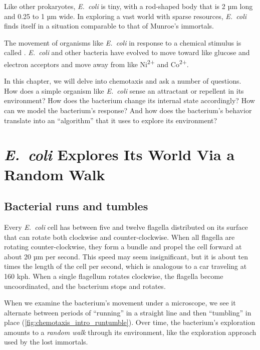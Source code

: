 Like other prokaryotes, \textit{E.~coli} is tiny, with a rod-shaped body that is 2 µm long and 0.25 to 1 µm wide. In exploring a vast world with sparse resources, \textit{E.~coli} finds itself in a situation comparable to that of Munroe's immortals.

The movement of organisms like \textit{E.~coli} in response to a chemical stimulus is called . \textit{E.~coli} and other bacteria have evolved to move toward  like glucose and electron acceptors and move away from  like Ni\textsuperscript{2+} and Co\textsuperscript{2+}.

In this chapter, we will delve into chemotaxis and ask a number of questions. How does a simple organism like \textit{E.~coli} sense an attractant or repellent in its environment? How does the bacterium change its internal state accordingly? How can we model the bacterium's response? And how does the bacterium's behavior translate into an ``algorithm'' that it uses to explore its environment?\\

\FloatBarrier
{}
\section{\textit{E.~coli} Explores Its World Via a Random Walk}
\label{sec:e_coli_explores_its_world_via_a_random_walk}

\subsection{Bacterial runs and tumbles}

Every \textit{E.~coli} cell has between five and twelve flagella distributed on its surface that can rotate both clockwise and counter-clockwise. When all flagella are rotating counter-clockwise, they form a bundle and propel the cell forward at about 20 µm per second. This speed may seem insignificant, but it is about ten times the length of the cell per second, which is analogous to a car traveling at 160 kph. When a single flagellum rotates clockwise, the flagella become uncoordinated, and the bacterium stops and rotates.

When we examine the bacterium's movement under a microscope, we see it alternate between periods of ``running'' in a straight line and then ``tumbling'' in place (\autoref{fig:chemotaxis_intro_runtumble}). Over time, the bacterium's  exploration amounts to a \textit{random walk} through its environment, like the exploration approach used by the lost immortals.\\

